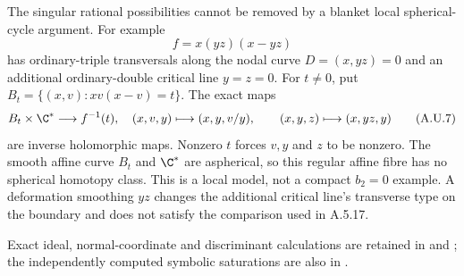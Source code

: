 The singular rational possibilities cannot be
removed by a blanket local spherical-cycle argument.
For example
\[
                     f=x(yz)(x-yz)
                                                        \tag{A.U.6}
\]
has ordinary-triple transversals along the nodal curve
$D=(x,yz)=0$ and an additional ordinary-double
critical line $y=z=0$. For $t\ne0$, put
$B_t=\{(x,v):xv(x-v)=t\}$. The exact maps
\[
 B_t\times\C^*\longrightarrow f^{-1}(t),
 \quad (x,v,y)\longmapsto(x,y,v/y),\qquad
 (x,y,z)\longmapsto(x,yz,y)
                                                        \tag{A.U.7}
\]
are inverse holomorphic maps. Nonzero $t$ forces
$v,y$ and $z$ to be nonzero. The smooth affine
curve $B_t$ and $\C^*$ are aspherical, so this
regular affine fibre has no spherical homotopy
class. This is a local model, not a compact
$b_2=0$ example. A deformation smoothing $yz$
changes the additional critical line's transverse
type on the boundary and does not satisfy the
comparison used in A.5.17.

Exact ideal, normal-coordinate and discriminant
calculations are retained in
 and
; the independently
computed symbolic saturations are also in
.
